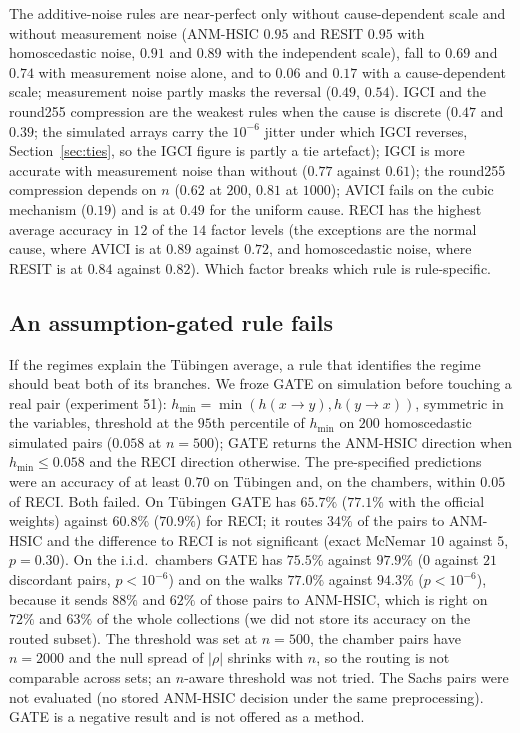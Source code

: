 The additive-noise rules are near-perfect only without cause-dependent scale and without measurement noise (ANM-HSIC $0.95$ and RESIT $0.95$ with homoscedastic noise, $0.91$ and $0.89$ with the independent scale), fall to $0.69$ and $0.74$ with measurement noise alone, and to $0.06$ and $0.17$ with a cause-dependent scale; measurement noise partly masks the reversal ($0.49$, $0.54$). IGCI and the round255 compression are the weakest rules when the cause is discrete ($0.47$ and $0.39$; the simulated arrays carry the $10^{-6}$ jitter under which IGCI reverses, Section~\ref{sec:ties}, so the IGCI figure is partly a tie artefact); IGCI is more accurate with measurement noise than without ($0.77$ against $0.61$); the round255 compression depends on $n$ ($0.62$ at $200$, $0.81$ at $1000$); AVICI fails on the cubic mechanism ($0.19$) and is at $0.49$ for the uniform cause. RECI has the highest average accuracy in $12$ of the $14$ factor levels (the exceptions are the normal cause, where AVICI is at $0.89$ against $0.72$, and homoscedastic noise, where RESIT is at $0.84$ against $0.82$). Which factor breaks which rule is rule-specific.

\subsection{An assumption-gated rule fails}\label{sec:gate}
If the regimes explain the T\"ubingen average, a rule that identifies the regime should beat both of its branches. We froze GATE on simulation before touching a real pair (experiment 51): $h_{\min}=\min(h(x\to y),h(y\to x))$, symmetric in the variables, threshold at the $95$th percentile of $h_{\min}$ on $200$ homoscedastic simulated pairs ($0.058$ at $n=500$); GATE returns the ANM-HSIC direction when $h_{\min}\le 0.058$ and the RECI direction otherwise. The pre-specified predictions were an accuracy of at least $0.70$ on T\"ubingen and, on the chambers, within $0.05$ of RECI. Both failed. On T\"ubingen GATE has $65.7\%$ ($77.1\%$ with the official weights) against $60.8\%$ ($70.9\%$) for RECI; it routes $34\%$ of the pairs to ANM-HSIC and the difference to RECI is not significant (exact McNemar $10$ against $5$, $p=0.30$). On the i.i.d.\ chambers GATE has $75.5\%$ against $97.9\%$ ($0$ against $21$ discordant pairs, $p<10^{-6}$) and on the walks $77.0\%$ against $94.3\%$ ($p<10^{-6}$), because it sends $88\%$ and $62\%$ of those pairs to ANM-HSIC, which is right on $72\%$ and $63\%$ of the whole collections (we did not store its accuracy on the routed subset). The threshold was set at $n=500$, the chamber pairs have $n=2000$ and the null spread of $|\rho|$ shrinks with $n$, so the routing is not comparable across sets; an $n$-aware threshold was not tried. The Sachs pairs were not evaluated (no stored ANM-HSIC decision under the same preprocessing). GATE is a negative result and is not offered as a method.

